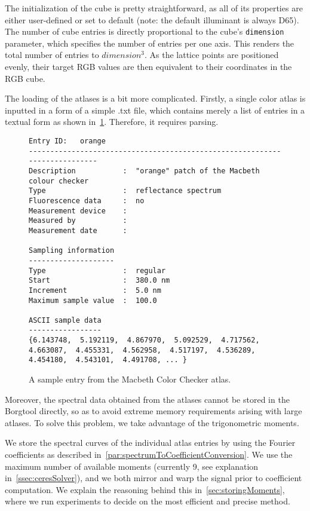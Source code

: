 The initialization of the cube is pretty straightforward, as all of its properties are either user-defined or set to default (note: the default illuminant is always D65). The number of cube entries is directly proportional to the cube's \texttt{dimension} parameter, which specifies the number of entries per one axis. This renders the total number of entries to $dimension^3$. As the lattice points are positioned evenly, their target RGB values are then equivalent to their coordinates in the RGB cube.

The loading of the atlases is a bit more complicated. Firstly, a single color atlas is inputted in a form of a simple .txt file, which contains merely a list of entries in a textual form as shown in~\cref{fig:macbethSampleText}. Therefore, it requires parsing.

\begin{figure}[t]
	\begin{lstlisting}
Entry ID:   orange
---------------------------------------------------------------------------
Description           :  "orange" patch of the Macbeth colour checker
Type                  :  reflectance spectrum
Fluorescence data     :  no
Measurement device    :  
Measured by           :  
Measurement date      :  

Sampling information
--------------------
Type	    	      :  regular
Start                 :  380.0 nm
Increment             :  5.0 nm
Maximum sample value  :  100.0

ASCII sample data
-----------------
{6.143748,  5.192119,  4.867970,  5.092529,  4.717562,  4.663087,  4.455331,  4.562958,  4.517197,  4.536289,  4.454180,  4.543101,  4.491708, ... }

	\end{lstlisting}
	\caption{A sample entry from the Macbeth Color Checker atlas.}
	\label{fig:macbethSampleText}
\end{figure}

Moreover, the spectral data obtained from the atlases cannot be stored in the Borgtool directly, so as to avoid extreme memory requirements arising with large atlases. To solve this problem, we take advantage of the trigonometric moments.

We store the spectral curves of the individual atlas entries by using the Fourier coefficients as described in~\cref{par:spectrumToCoefficientConversion}. We use the maximum number of available moments (currently 9, see explanation in~\cref{ssec:ceresSolver}), and we both mirror and warp the signal prior to coefficient computation. We explain the reasoning behind this in~\cref{sec:storingMoments}, where we run experiments to decide on the most efficient and precise method.

